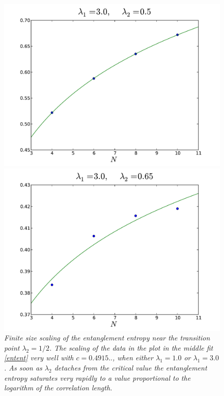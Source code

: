 \documentclass[aps,pra,superscriptaddress]{revtex4}
\renewcommand{\(}{\left(}
\renewcommand{\)}{\right)}
\renewcommand{\[}{\left[}
\renewcommand{\]}{\right]}
\begin{document}
\begin{figure}[H]
{\begin{minipage}{0.33\textwidth}
\includegraphics[scale=0.32]{Figures/ee23_50.pdf}
\end{minipage}
\hspace{4mm}
\begin{minipage}{0.33\textwidth}
\includegraphics[scale=0.32]{Figures/ee23_65.pdf}
\end{minipage}}
\caption{{\em Finite size scaling of the entanglement entropy near the transition point $\lambda_2 = 1/2$. The scaling of the data in the plot in the middle fit \eqref{entent} very well with $c=0.4915..$, when either $\lambda_1=1.0$ or $\lambda_1=3.0$. As soon as $\lambda_2$ detaches from the critical value the entanglement entropy saturates very rapidly to a value proportional to the logarithm of the correlation length.}}
\label{ee2}
\end{figure}
\end{document}
